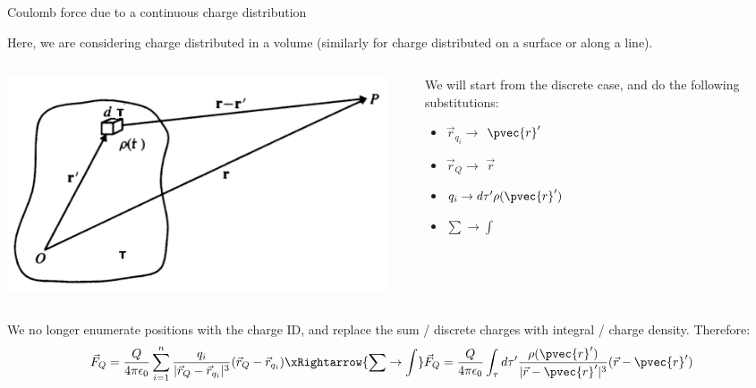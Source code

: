 \begin{frame}{Coulomb force due to a continuous charge distribution}

Here, we are considering charge distributed in a volume
(similarly for charge distributed on a surface or along a line).

\begin{columns}
  \begin{column}{0.60\textwidth}
    \begin{center}
      \includegraphics[width=0.95\textwidth]{./images/schematics/charge_distribution_3d_tau.png}\\
    \end{center}
  \end{column}
  \begin{column}{0.40\textwidth}
     We will start from the discrete case, and do the following substitutions:
     \begin{itemize}
       \item $\vec{r}_{q_i} \rightarrow$ $\pvec{r}'$
       \item $\vec{r}_{Q} \rightarrow$ $\vec{r}$
       \item $q_i \rightarrow d\tau^{\prime} \rho(\pvec{r}')$
       \item $\sum \rightarrow \int$
     \end{itemize}
  \end{column}
\end{columns}

\vspace{0.1cm}
We no longer enumerate positions with the charge ID, and replace the sum / discrete
charges with integral / charge density.
Therefore:
\begin{equation*}
   \vec{F}_{Q} = \frac{Q}{4\pi\epsilon_0} \sum_{i=1}^{n}
      \frac{q_i}{|\vec{r}_{Q}-\vec{r}_{q_{i}}|^{3}} (\vec{r}_{Q}-\vec{r}_{q_{i}})
   \xRightarrow{\sum\rightarrow\int}
   \vec{F}_{Q} = \frac{Q}{4\pi\epsilon_0} \int_{\tau}
      d\tau^{\prime} \frac{\rho({\pvec{r}'})}{|\vec{r}-\pvec{r}'|^{3}} (\vec{r}-\pvec{r}')
\end{equation*}

\end{frame}


